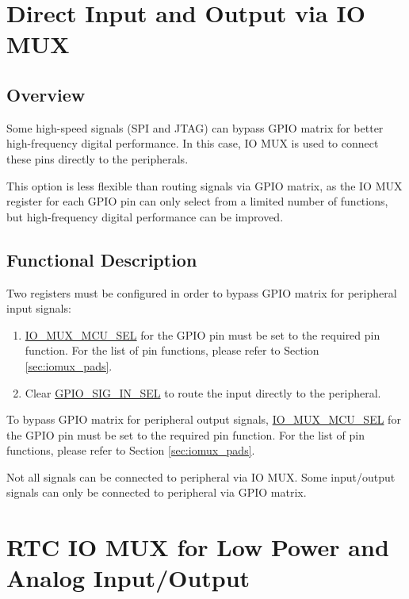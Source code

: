 \documentclass[main\_\_EN.tex]{subfiles}
\begin{document}
\section{Direct Input and Output via IO MUX}

\subsection{Overview}

Some high-speed signals (SPI and JTAG) can bypass GPIO matrix for better high-frequency digital performance. In this case, IO MUX is used to connect these pins directly to the peripherals.

This option is less flexible than routing signals via GPIO matrix, as the IO MUX register for each GPIO pin can only select from a limited number of functions, but high-frequency digital performance can be improved.

\subsection{Functional Description}

Two registers must be configured in order to bypass GPIO matrix for peripheral input signals:

\begin{enumerate}
\item \hyperref[fielddesc:IOMUXMCUSEL]{IO\_MUX\_MCU\_SEL} for the GPIO pin must be set to the required pin function. For the list of pin functions, please refer to Section \ref{sec:iomux_pads}.
\item Clear \hyperref[fielddesc:GPIOSIGNINSEL]{GPIO\_SIG\_IN\_SEL} to route the input directly to the peripheral.
\end{enumerate}

To bypass GPIO matrix for peripheral output signals, \hyperref[fielddesc:IOMUXMCUSEL]{IO\_MUX\_MCU\_SEL} for the GPIO pin must be set to the required pin function. For the list of pin functions, please refer to Section \ref{sec:iomux_pads}.

\begin{tiplisting}
Not all signals can be connected to peripheral via IO MUX. Some input/output signals can only be connected to peripheral via GPIO matrix.
\end{tiplisting}

\section{RTC IO MUX for Low Power and Analog Input/Output}
\end{document}
